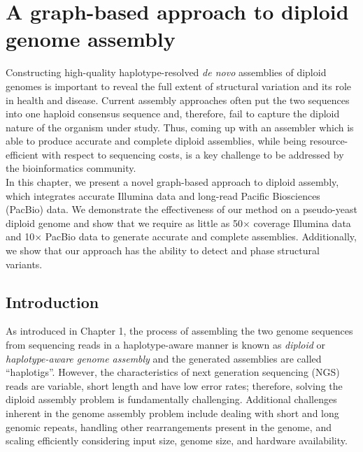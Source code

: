 \chapter{A graph-based approach to diploid genome assembly}
Constructing high-quality haplotype-resolved \textit{de novo} assemblies of diploid genomes is important to reveal the full extent of structural variation and its role in health and disease.
Current assembly approaches often put the two sequences into one haploid consensus sequence and, therefore, fail to capture the diploid nature of the organism under study.
Thus, coming up with an assembler which is able to produce accurate and complete diploid assemblies, while being resource-efficient with respect to sequencing costs, 
is a key challenge to be addressed by the bioinformatics community.\\

In this chapter, we present a novel graph-based approach to diploid assembly, which integrates accurate Illumina data and long-read Pacific Biosciences (PacBio) data.
We demonstrate the effectiveness of our method on a pseudo-yeast diploid genome and show that we require as little as 50$\times$ coverage Illumina data 
and 10$\times$ PacBio data to generate accurate and complete assemblies.
Additionally, we show that our approach has the ability to detect and phase structural variants.\\


\section{Introduction}
As introduced in Chapter 1, the process of assembling the two genome sequences from sequencing reads in a haplotype-aware manner is known as \textit{diploid} or \textit{haplotype-aware genome assembly} and the generated assemblies are called ``haplotigs''.
However, the characteristics of next generation sequencing (NGS) reads are variable, short length and have low error rates; therefore, solving the diploid assembly problem is fundamentally challenging.
Additional challenges inherent in the genome assembly problem include dealing with short and long genomic repeats, handling other rearrangements present in the genome, and scaling efficiently considering input size, genome size, and hardware availability.

